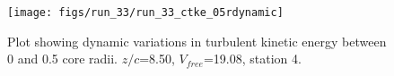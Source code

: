 \begin{figure}[H]
\centering
\texttt{[image: figs/run\_33/run\_33\_ctke\_05rdynamic]}
\caption{Plot showing dynamic variations in turbulent kinetic energy between 0 and 0.5 core radii. $z/c$=8.50, $V_{free}$=19.08, station 4.}
\label{fig:run_33_ctke_05rdynamic}
\end{figure}


